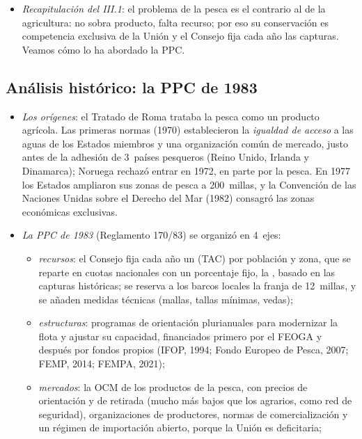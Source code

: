 \documentclass[11pt]{article}
\begin{document}
\begin{itemize}
\item \emph{Recapitulación del III.1}: el problema de la pesca es el contrario al de la agricultura: no sobra producto, falta recurso; por eso su conservación es competencia exclusiva de la Unión y el Consejo fija cada año las capturas. Veamos cómo lo ha abordado la PPC.
\end{itemize}

\subsection{Análisis histórico: la PPC de 1983}\label{sec:ppc-historia}

\begin{itemize}
\item \emph{Los orígenes}: el Tratado de Roma trataba la pesca como un producto agrícola. Las primeras normas (1970) establecieron la \emph{igualdad de acceso} a las aguas de los Estados miembros y una organización común de mercado, justo antes de la adhesión de 3~países pesqueros (Reino Unido, Irlanda y Dinamarca); Noruega rechazó entrar en 1972, en parte por la pesca. En 1977 los Estados ampliaron sus zonas de pesca a 200~millas, y la Convención de las Naciones Unidas sobre el Derecho del Mar (1982) consagró las zonas económicas exclusivas.
\item \emph{La PPC de 1983} (Reglamento 170/83) se organizó en 4~ejes\nocite{UE1983PPC,PE2026FichaPesca}:
  \begin{itemize}
  \item \emph{recursos}: el Consejo fija cada año un  (TAC) por población y zona, que se reparte en cuotas nacionales con un porcentaje fijo, la , basado en las capturas históricas; se reserva a los barcos locales la franja de 12~millas, y se añaden medidas técnicas (mallas, tallas mínimas, vedas);
  \item \emph{estructuras}: programas de orientación plurianuales para modernizar la flota y ajustar su capacidad, financiados primero por el FEOGA y después por fondos propios (IFOP, 1994; Fondo Europeo de Pesca, 2007; FEMP, 2014; FEMPA, 2021);
  \item \emph{mercados}: la OCM de los productos de la pesca, con precios de orientación y de retirada (mucho más bajos que los agrarios, como red de seguridad), organizaciones de productores, normas de comercialización y un régimen de importación abierto, porque la Unión es deficitaria;

\end{itemize}
\end{itemize}
\end{document}
